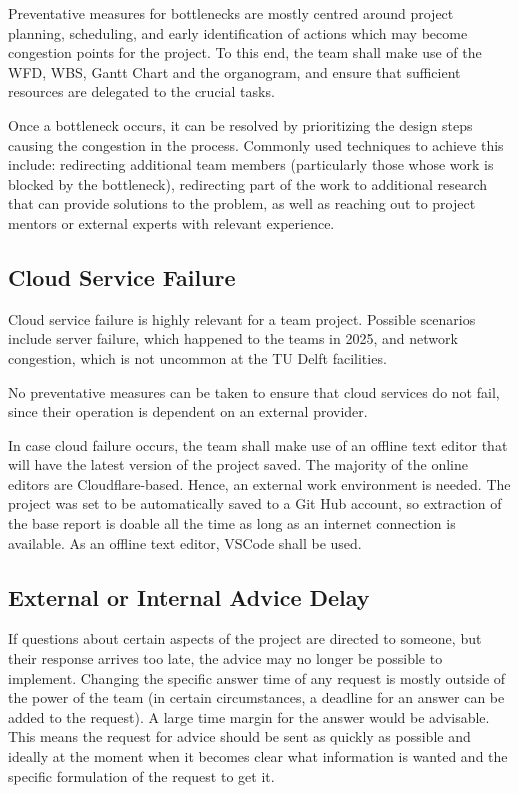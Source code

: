 Preventative measures for bottlenecks are mostly centred around project planning, scheduling, and early identification of actions which may become congestion points for the project. To this end, the team shall make use of the WFD, WBS, Gantt Chart and the organogram, and ensure that sufficient resources are delegated to the crucial tasks.

Once a bottleneck occurs, it can be resolved by prioritizing the design steps causing the congestion in the process. Commonly used techniques to achieve this include: redirecting additional team members (particularly those whose work is blocked by the bottleneck), redirecting part of the work to additional research that can provide solutions to the problem, as well as reaching out to project mentors or external experts with relevant experience.

\subsection{Cloud Service Failure}
Cloud service failure is highly relevant for a team project. Possible scenarios include server failure, which happened to the teams in 2025, and network congestion, which is not uncommon at the TU Delft facilities.

No preventative measures can be taken to ensure that cloud services do not fail, since their operation is dependent on an external provider.


In case cloud failure occurs, the team shall make use of an offline text editor that will have the latest version of the project saved. The majority of the online editors are Cloudflare-based. Hence, an external work environment is needed. The project was set to be automatically saved to a Git Hub account, so extraction of the base report is doable all the time as long as an internet connection is available. As an offline text editor, VSCode shall be used.


\subsection{External or Internal Advice Delay}
If questions about certain aspects of the project are directed to someone, but their response arrives too late, the advice may no longer be possible to implement. Changing the specific answer time of any request is mostly outside of the power of the team (in certain circumstances, a deadline for an answer can be added to the request). A large time margin for the answer would be advisable. This means the request for advice should be sent as quickly as possible and ideally at the moment when it becomes clear what information is wanted and the specific formulation of the request to get it.        

